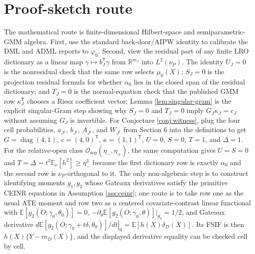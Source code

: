 \documentclass[11pt]{article}
\newcommand{\E}{\mathbb{E}}
\newcommand{\transpose}{\mathsf{T}}
\newcommand{\R}{\mathbb{R}}
\theoremstyle{definition}
\theoremstyle{plain}
\theoremstyle{remark}
\begin{document}
\section{Proof-sketch route}
The mathematical route is finite-dimensional Hilbert-space and
semiparametric-GMM algebra.  First, use the standard back-door/AIPW identity to
calibrate the DML and ADML reports to \(\varphi_0\).  Second, view the residual
part of any finite LRO dictionary as a linear map
\(\gamma\mapsto b_J^\transpose\gamma\) from \(\R^{m_J}\) into \(L^2(\nu_P)\).
The identity \(U_J=0\) is the nonresidual check that the same row selects
\(\mu_0(X)\); \(S_J=0\) is the projection residual formula for whether
\(\alpha_0\) lies in the closed span of the residual dictionary; and \(T_J=0\)
is the normal-equation check that the published GMM row
\(\kappa_J^\transpose\) chooses a Riesz coefficient vector; Lemma
\ref{lem:singular-gram} is the explicit singular-Gram step showing why
\(S_J=0\) and \(T_J=0\) imply \(G_J\kappa_J=c_J\) without assuming \(G_J\) is
invertible.  For Conjecture
\ref{conj:witness}, plug the four cell probabilities, \(a_{J^\dagger}\),
\(b_{J^\dagger}\), \(A_{J^\dagger}\), and
\(W_{J^\dagger}\) from Section 6 into the definitions to get
\(G=\operatorname{diag}(4,1)\), \(c=(4,0)^\transpose\), \(\kappa=(1,1)^\transpose\),
\(U=0\), \(S=0\), \(T=1\), and \(\Delta=1\).  For the relative-open class
\(\mathcal O_{\mathrm{sep}}(\eta_-,\eta_+)\), the same computation gives
\(U=S=0\) and \(T=\Delta=t^2\E_\nu[h^2]\ge\eta_-^3\) because the first
dictionary row is exactly \(\alpha_0\) and the second row is \(\nu_P\)-orthogonal
to it.  The only non-algebraic step is to construct
identifying moments \(g_1,g_2\) whose Gateaux derivatives satisfy the primitive
CEINR equations in Assumption \ref{ass:ceinr}; one route is to take row one as
the usual ATE moment and row two as a centered covariate-contrast linear
functional with \(\E[g_2(O;\gamma_0,\theta_0)]=0\),
\(-\partial_\theta\E[g_2(O;\gamma_0,\theta)]|_{\theta_0}=1/2\), and
Gateaux derivative
\(\left.d\E[g_2(O;\gamma_0+t\delta,\theta_0)]/dt\right|_{0}
=\E[h(X)\delta_D(X)]\).  Its FSIF is then \(h(X)\{Y-m_D(X)\}\), and the
displayed derivative equality can be checked cell by cell.
\end{document}
